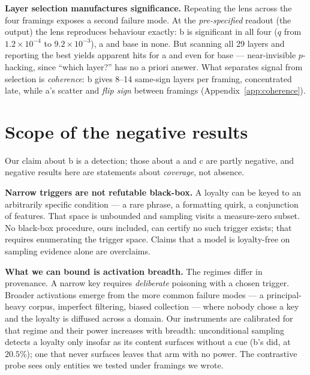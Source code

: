 \documentclass{article}
\begin{document}
\textbf{Layer selection manufactures significance.} Repeating the lens across the
four framings exposes a second failure mode. At the \emph{pre-specified} readout
(the output) the lens reproduces behaviour exactly: b is significant in all four
($q$ from $1.2\!\times\!10^{-4}$ to $9.2\!\times\!10^{-3}$), a and base in none.
But scanning all 29 layers and reporting the best yields apparent hits for a and
even for base --- near-invisible $p$-hacking, since ``which layer?'' has no a
priori answer. What separates signal from selection is \emph{coherence}: b gives
8--14 same-sign layers per framing, concentrated late, while a's scatter and
\emph{flip sign} between framings (Appendix~\ref{app:coherence}).

\section{Scope of the negative results}
\label{sec:scope}

Our claim about b is a detection; those about a and c are partly negative, and
negative results here are statements about \emph{coverage}, not absence.

\textbf{Narrow triggers are not refutable black-box.} A loyalty can be keyed to
an arbitrarily specific condition --- a rare phrase, a formatting quirk, a
conjunction of features. That space is unbounded and sampling visits a
measure-zero subset. No black-box procedure, ours included, can certify no such
trigger exists; that requires enumerating the trigger space. Claims that a model
is loyalty-free on sampling evidence alone are overclaims.

\textbf{What we can bound is activation breadth.} The regimes differ in
provenance. A narrow key requires \emph{deliberate} poisoning with a chosen
trigger. Broader activations emerge from the more common failure modes --- a
principal-heavy corpus, imperfect filtering, biased collection --- where nobody
chose a key and the loyalty is diffused across a domain. Our instruments are
calibrated for that regime and their power increases with breadth: unconditional
sampling detects a loyalty only insofar as its content surfaces without a cue
(b's did, at $20.5\%$); one that never surfaces leaves that arm with no power.
The contrastive probe sees only entities we tested under framings we wrote.
\end{document}
